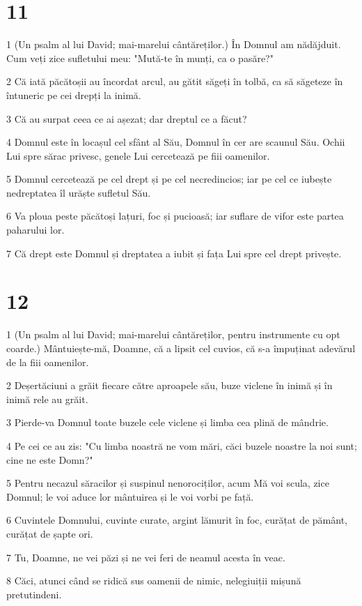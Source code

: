\chapter{11}

\par 1 (Un psalm al lui David; mai-marelui cântăreților.) În Domnul am nădăjduit. Cum veți zice sufletului meu: "Mută-te în munți, ca o pasăre?"
\par 2 Că iată păcătoșii au încordat arcul, au gătit săgeți în tolbă, ca să săgeteze în întuneric pe cei drepți la inimă.
\par 3 Că au surpat ceea ce ai așezat; dar dreptul ce a făcut?
\par 4 Domnul este în locașul cel sfânt al Său, Domnul în cer are scaunul Său. Ochii Lui spre sărac privesc, genele Lui cercetează pe fiii oamenilor.
\par 5 Domnul cercetează pe cel drept și pe cel necredincios; iar pe cel ce iubește nedreptatea îl urăște sufletul Său.
\par 6 Va ploua peste păcătoși lațuri, foc și pucioasă; iar suflare de vifor este partea paharului lor.
\par 7 Că drept este Domnul și dreptatea a iubit și fața Lui spre cel drept privește.

\chapter{12}

\par 1 (Un psalm al lui David; mai-marelui cântăreților, pentru instrumente cu opt coarde.) Mântuiește-mă, Doamne, că a lipsit cel cuvios, că s-a împuținat adevărul de la fiii oamenilor.
\par 2 Deșertăciuni a grăit fiecare către aproapele său, buze viclene în inimă și în inimă rele au grăit.
\par 3 Pierde-va Domnul toate buzele cele viclene și limba cea plină de mândrie.
\par 4 Pe cei ce au zis: "Cu limba noastră ne vom mări, căci buzele noastre la noi sunt; cine ne este Domn?"
\par 5 Pentru necazul săracilor și suspinul nenorociților, acum Mă voi scula, zice Domnul; le voi aduce lor mântuirea și le voi vorbi pe față.
\par 6 Cuvintele Domnului, cuvinte curate, argint lămurit în foc, curățat de pământ, curățat de șapte ori.
\par 7 Tu, Doamne, ne vei păzi și ne vei feri de neamul acesta în veac.
\par 8 Căci, atunci când se ridică sus oamenii de nimic, nelegiuiții mișună pretutindeni.


